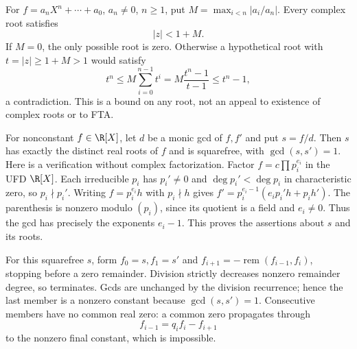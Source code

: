 For $f=a_nX^n+\cdots+a_0$, $a_n\ne0$, $n\ge1$, put
$M=\max_{i<n}|a_i/a_n|$. Every complex root satisfies
\begin{equation}\label{eq:cauchy-root-bound}
 |z|<1+M.
\end{equation}
If $M=0$, the only possible root is zero. Otherwise a hypothetical
root with $t=|z|\ge1+M>1$ would satisfy
\[
 t^n\le M\sum_{i=0}^{n-1}t^i
 =M\frac{t^n-1}{t-1}\le t^n-1,
\]
a contradiction. This is a bound on any root, not an appeal to
existence of complex roots or to FTA.

For nonconstant $f\in\R[X]$, let $d$ be a monic gcd of $f,f'$ and
put $s=f/d$. Then $s$ has exactly the distinct real roots of $f$
and is squarefree, with $\gcd(s,s')=1$.
Here is a verification without complex factorization.
Factor $f=c\prod p_i^{e_i}$ in the UFD $\R[X]$.
Each irreducible $p_i$ has $p_i'\ne0$ and $\deg p_i'<\deg p_i$
in characteristic zero, so $p_i\nmid p_i'$.
Writing $f=p_i^{e_i}h$ with $p_i\nmid h$ gives
$f'=p_i^{e_i-1}(e_i p_i'h+p_i h')$.
The parenthesis is nonzero modulo $(p_i)$, since its quotient
is a field and $e_i\ne0$. Thus the gcd has precisely the
exponents $e_i-1$. This proves the assertions about $s$ and its roots.

For this squarefree $s$, form
$f_0=s,f_1=s'$ and
$f_{i+1}=-\operatorname{rem}(f_{i-1},f_i)$,
stopping before a zero remainder. Division strictly decreases
nonzero remainder degree, so terminates. Gcds are unchanged by
the division recurrence; hence the last member is a nonzero
constant because $\gcd(s,s')=1$.
Consecutive members have no common real zero: a common zero
propagates through
\[
 f_{i-1}=q_i f_i-f_{i+1}
\]
to the nonzero final constant, which is impossible.

